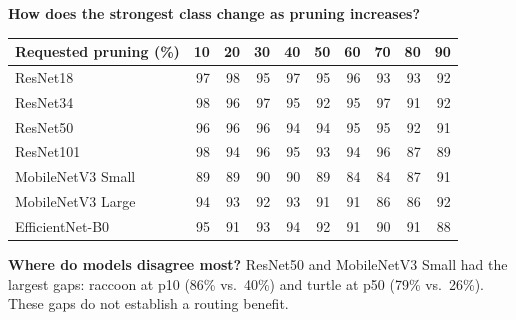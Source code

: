 \textbf{How does the strongest class change as pruning increases?}
\vspace{-4pt}\begin{center}\small\setlength{\tabcolsep}{5pt}
\begin{tabular}{@{}l*{9}{r}@{}}\toprule
Requested pruning (\%) & 10 & 20 & 30 & 40 & 50 & 60 & 70 & 80 & 90\\
\midrule
ResNet18 & \cellcolor{teal!61}97 & \cellcolor{teal!62}98 & \cellcolor{teal!60}95 & \cellcolor{teal!61}97 & \cellcolor{teal!60}95 & \cellcolor{teal!60}96 & \cellcolor{teal!59}93 & \cellcolor{teal!59}93 & \cellcolor{teal!58}92\\
ResNet34 & \cellcolor{teal!62}98 & \cellcolor{teal!60}96 & \cellcolor{teal!61}97 & \cellcolor{teal!60}95 & \cellcolor{teal!58}92 & \cellcolor{teal!60}95 & \cellcolor{teal!61}97 & \cellcolor{teal!57}91 & \cellcolor{teal!58}92\\
ResNet50 & \cellcolor{teal!60}96 & \cellcolor{teal!60}96 & \cellcolor{teal!60}96 & \cellcolor{teal!59}94 & \cellcolor{teal!59}94 & \cellcolor{teal!60}95 & \cellcolor{teal!60}95 & \cellcolor{teal!58}92 & \cellcolor{teal!57}91\\
ResNet101 & \cellcolor{teal!62}98 & \cellcolor{teal!59}94 & \cellcolor{teal!60}96 & \cellcolor{teal!60}95 & \cellcolor{teal!59}93 & \cellcolor{teal!59}94 & \cellcolor{teal!60}96 & \cellcolor{teal!55}87 & \cellcolor{teal!56}89\\
MobileNetV3 Small & \cellcolor{teal!56}89 & \cellcolor{teal!56}89 & \cellcolor{teal!57}90 & \cellcolor{teal!57}90 & \cellcolor{teal!56}89 & \cellcolor{teal!53}84 & \cellcolor{teal!53}84 & \cellcolor{teal!55}87 & \cellcolor{teal!57}91\\
MobileNetV3 Large & \cellcolor{teal!59}94 & \cellcolor{teal!59}93 & \cellcolor{teal!58}92 & \cellcolor{teal!59}93 & \cellcolor{teal!57}91 & \cellcolor{teal!57}91 & \cellcolor{teal!54}86 & \cellcolor{teal!54}86 & \cellcolor{teal!58}92\\
EfficientNet-B0 & \cellcolor{teal!60}95 & \cellcolor{teal!57}91 & \cellcolor{teal!59}93 & \cellcolor{teal!59}94 & \cellcolor{teal!58}92 & \cellcolor{teal!57}91 & \cellcolor{teal!57}90 & \cellcolor{teal!57}91 & \cellcolor{teal!55}88\\
\bottomrule\end{tabular}
\end{center}\vspace{-4pt}

\textbf{Where do models disagree most?}
ResNet50 and MobileNetV3 Small had the largest gaps: raccoon at p10 (86\% vs.\ 40\%) and turtle at p50 (79\% vs.\ 26\%). These gaps do not establish a routing benefit.

